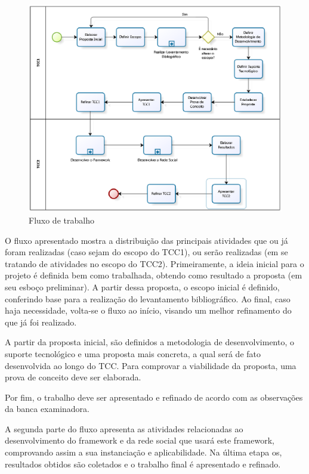 \begin{figure}
	\centering
	\includegraphics[scale=0.8]{figuras/capitulo4/processo_tcc.eps}
	\caption{Fluxo de trabalho}
	\label{processo tcc}
\end{figure}

O fluxo apresentado mostra a distribuição das principais atividades que ou já foram realizadas (caso sejam do escopo do TCC1), ou serão realizadas (em se tratando de atividades no escopo do TCC2). Primeiramente, a ideia inicial para o projeto é definida bem como trabalhada, obtendo como resultado a proposta (em seu esboço preliminar). A partir dessa proposta, o escopo inicial é definido, conferindo base para a realização do levantamento bibliográfico. Ao final, caso haja necessidade, volta-se o fluxo ao início, visando um melhor refinamento do que já foi realizado.

A partir da proposta inicial, são definidos a metodologia de desenvolvimento, o suporte tecnológico e uma proposta mais concreta, a qual será de fato desenvolvida ao longo do TCC. Para comprovar a viabilidade da proposta, uma prova de conceito deve ser elaborada.

Por fim, o trabalho deve ser apresentado e refinado de acordo com as observações da banca examinadora.

A segunda parte do fluxo apresenta as atividades relacionadas ao desenvolvimento do framework e da rede social que usará este framework, comprovando assim a sua instanciação e aplicabilidade. Na última etapa os, resultados obtidos são coletados e o trabalho final é apresentado e refinado.

